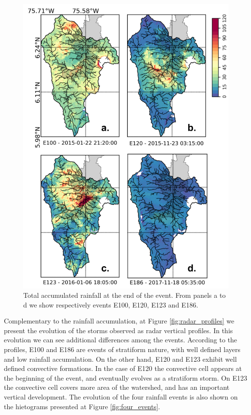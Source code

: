 \documentclass[preprint,12pt]{elsarticle}
\begin{document}
\begin{figure}[!h]
    \centering
    \includegraphics[width=14cm]{Figuras/Rainfall_accumulation.png}
    \caption{Total accumulated rainfall at the end of the event.  From panels a to d we show respectively events E100, E120, E123 and E186.}
    \label{fig:rainfall_acum}
\end{figure}
Complementary to the rainfall accumulation, at Figure \ref{fig:radar_profiles} we present the evolution of the storms observed as radar vertical profiles. In this evolution we can see additional differences among the events.  According to the profiles, E100 and E186 are events of stratiform nature, with well defined layers and low rainfall accumulation.  On the other hand, E120 and E123 exhibit well defined convective formations.  In the case of E120 the convective cell appears at the beginning of the event, and eventually evolves as a stratiform storm.  On E123 the convective cell covers more area of the watershed, and has an important vertical development.  The evolution of the four rainfall events is also shown on the hietograms presented at Figure \ref{fig:four_events}.  
\end{document}
